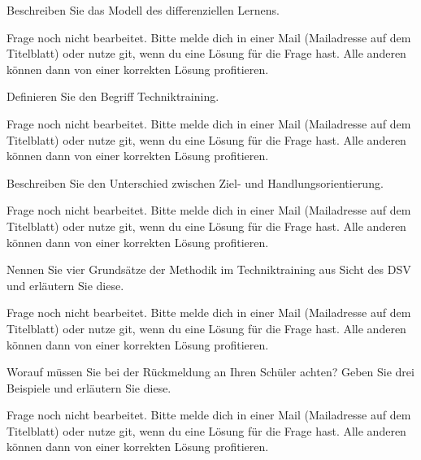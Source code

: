 \begin{question}{5}
    Beschreiben Sie das Modell des differenziellen Lernens.
\end{question}
\begin{solution}
    Frage noch nicht bearbeitet. Bitte melde dich in einer Mail (Mailadresse auf dem Titelblatt) oder nutze git, wenn du eine Lösung für die Frage hast. Alle anderen können dann von einer korrekten Lösung profitieren.
\end{solution}

\begin{question}{2}
    Definieren Sie den Begriff Techniktraining.
\end{question}
\begin{solution}
    Frage noch nicht bearbeitet. Bitte melde dich in einer Mail (Mailadresse auf dem Titelblatt) oder nutze git, wenn du eine Lösung für die Frage hast. Alle anderen können dann von einer korrekten Lösung profitieren.
\end{solution}

\begin{question}{4}
    Beschreiben Sie den Unterschied zwischen Ziel- und Handlungsorientierung.
\end{question}
\begin{solution}
    Frage noch nicht bearbeitet. Bitte melde dich in einer Mail (Mailadresse auf dem Titelblatt) oder nutze git, wenn du eine Lösung für die Frage hast. Alle anderen können dann von einer korrekten Lösung profitieren.
\end{solution}

\begin{question}{6}
    Nennen Sie vier Grundsätze der Methodik im Techniktraining aus Sicht des DSV und erläutern Sie diese.
\end{question}
\begin{solution}
    Frage noch nicht bearbeitet. Bitte melde dich in einer Mail (Mailadresse auf dem Titelblatt) oder nutze git, wenn du eine Lösung für die Frage hast. Alle anderen können dann von einer korrekten Lösung profitieren.
\end{solution}

\begin{question}{6}
    Worauf müssen Sie bei der Rückmeldung an Ihren Schüler achten? Geben Sie drei Beispiele und erläutern Sie diese.
\end{question}
\begin{solution}
    Frage noch nicht bearbeitet. Bitte melde dich in einer Mail (Mailadresse auf dem Titelblatt) oder nutze git, wenn du eine Lösung für die Frage hast. Alle anderen können dann von einer korrekten Lösung profitieren.
\end{solution}